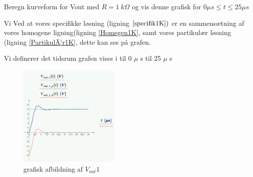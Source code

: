 Beregn kurveform for Vout med $R= 1\ k\Omega$
og vis denne grafisk for $0 \mu s \leq t \leq 25 \mu s$ 

Vi Ved at vores specifikke løsning (ligning $\ref{specifik1K})$ er en sammensætning af vores homogene ligning(ligning \ref{Homegen1K}, samt vores partikulær løsning (ligning \ref{PartikulÃ¦r1K}, dette kan ses på grafen.

Vi definerer det tidsrum grafen vises i til 0 $\mu$ s til 25 $\mu$ s

\begin{figure}[h]
 \begin{center}
  \includegraphics[height=5cm]{P_Fig/figur15_ana2graf1K}
  \caption{grafisk afbildning af $V_{out}{1}$}
  \label{graf_2orden_1K}
 \end{center}
\end{figure}
